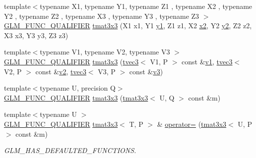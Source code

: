 \begin{DoxyCompactItemize}
{\footnotesize template$<$typename X1, typename Y1, typename Z1 , typename X2 , typename Y2 , typename Z2 , typename X3 , typename Y3 , typename Z3 $>$ }\\\mbox{\hyperlink{setup_8hpp_a33fdea6f91c5f834105f7415e2a64407}{G\+L\+M\+\_\+\+F\+U\+N\+C\+\_\+\+Q\+U\+A\+L\+I\+F\+I\+ER}} \mbox{\hyperlink{structglm_1_1tmat3x3_ad8e35f18c7065afeec8ddca4f7497a26}{tmat3x3}} (X1 x1, Y1 \mbox{\hyperlink{glad_8h_a48340161068d267815ac3131e9d03def}{y1}}, Z1 z1, X2 \mbox{\hyperlink{glad_8h_ad2cea6eadb01f017f0d57e7edf0ce988}{x2}}, Y2 \mbox{\hyperlink{glad_8h_af7158b5d27f7a6aa4ab9973fcc3a5c20}{y2}}, Z2 z2, X3 x3, Y3 y3, Z3 z3)
\item 
{\footnotesize template$<$typename V1, typename V2, typename V3 $>$ }\\\mbox{\hyperlink{setup_8hpp_a33fdea6f91c5f834105f7415e2a64407}{G\+L\+M\+\_\+\+F\+U\+N\+C\+\_\+\+Q\+U\+A\+L\+I\+F\+I\+ER}} \mbox{\hyperlink{structglm_1_1tmat3x3_a065a41b6dbbc35bc4785e7f429359a2f}{tmat3x3}} (\mbox{\hyperlink{structglm_1_1tvec3}{tvec3}}$<$ V1, P $>$ const \&\mbox{\hyperlink{glad_8h_a0779c3b73f9aa3a0ac5b0139b5d291d9}{v1}}, \mbox{\hyperlink{structglm_1_1tvec3}{tvec3}}$<$ V2, P $>$ const \&\mbox{\hyperlink{glad_8h_a9a09a1837922b2b806f4589096a52049}{v2}}, \mbox{\hyperlink{structglm_1_1tvec3}{tvec3}}$<$ V3, P $>$ const \&\mbox{\hyperlink{glad_8h_acc806b31cbf466ceba6555983d8b814d}{v3}})
\item 
{\footnotesize template$<$typename U, precision Q$>$ }\\\mbox{\hyperlink{setup_8hpp_a33fdea6f91c5f834105f7415e2a64407}{G\+L\+M\+\_\+\+F\+U\+N\+C\+\_\+\+Q\+U\+A\+L\+I\+F\+I\+ER}} \mbox{\hyperlink{structglm_1_1tmat3x3_afdeefb27eb8d3d2a1b10d08487e6a1c9}{tmat3x3}} (\mbox{\hyperlink{structglm_1_1tmat3x3}{tmat3x3}}$<$ U, Q $>$ const \&m)
\item 
{\footnotesize template$<$typename U $>$ }\\\mbox{\hyperlink{setup_8hpp_a33fdea6f91c5f834105f7415e2a64407}{G\+L\+M\+\_\+\+F\+U\+N\+C\+\_\+\+Q\+U\+A\+L\+I\+F\+I\+ER}} \mbox{\hyperlink{structglm_1_1tmat3x3}{tmat3x3}}$<$ T, P $>$ \& \mbox{\hyperlink{structglm_1_1tmat3x3_a3d87b69cdea2bbbcca29b6ba356ae943}{operator=}} (\mbox{\hyperlink{structglm_1_1tmat3x3}{tmat3x3}}$<$ U, P $>$ const \&m)
\begin{DoxyCompactList}\small\item\em G\+L\+M\+\_\+\+H\+A\+S\+\_\+\+D\+E\+F\+A\+U\+L\+T\+E\+D\+\_\+\+F\+U\+N\+C\+T\+I\+O\+NS. \end{DoxyCompactList}\item 

\end{DoxyCompactItemize}
